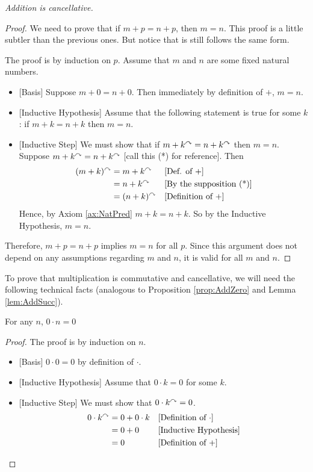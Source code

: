 \begin{prop}
  \emph{Addition is cancellative.}

\begin{proof}
  We need to prove that if $m + p= n+p$, then $m=n$.  This proof is a little subtler than the previous ones. But notice that is
  still follows the same form.
  
  The proof is by induction on $p$. Assume that $m$ and $n$ are some fixed natural numbers.
  \begin{itemize}
  \item{}[Basis] Suppose $m+0 = n+ 0$. Then immediately by definition
    of $+$, $m=n$.
  \item{}[Inductive Hypothesis] Assume that the following statement is true for some $k$: if $m + k = n + k$ then $m=n$.
  \item{}[Inductive Step] We must show that 
    if $m+k^\curvearrowright = n+k^\curvearrowright$ then $m=n$. Suppose $m+k^\curvearrowright = n + k^\curvearrowright$ [call this (*) for reference]. Then
    \begin{align*}
      (m+k)^\curvearrowright & = m + k^\curvearrowright &&\text{[Def. of $+$]}\\
      & = n + k^\curvearrowright &&\text{[By the supposition (*)]}\\
      & = (n+k)^\curvearrowright &&\text{[Definition of $+$]}
    \end{align*}
    Hence, by Axiom \ref{ax:NatPred} $m+k=n+k$. So by the Inductive Hypothesis, $m=n$.
  \end{itemize}
  Therefore, $m + p = n + p$ implies $m = n$ for all $p$. Since this argument does not
depend on any assumptions regarding $m$ and $n$, it is valid for all $m$ and $n$.
\end{proof}
\end{prop}
\ipadbreak

To prove that multiplication is commutative and cancellative, we will
need the following technical facts (analogous to Proposition
\ref{prop:AddZero} and Lemma \ref{lem:AddSucc}).

\begin{lem}\label{lem:MultZero}
  For any $n$, $0\cdot n = 0$

  \begin{proof}
    The proof is by induction on $n$.
    \begin{itemize}
    \item{}[Basis] $0\cdot 0 = 0$ by definition of $\cdot$.
    \item{}[Inductive Hypothesis] Assume that $0\cdot k = 0$ for some
      $k$.
    \item{}[Inductive Step] We must show that $0\cdot k^\curvearrowright = 0$.
      \begin{align*}
        0\cdot k^\curvearrowright &= 0 + 0\cdot k &&\text{[Definition of $\cdot$]}\\
        &= 0 + 0 &&\text{[Inductive Hypothesis]}\\
        &= 0&&\text{[Definition of $+$]}
      \end{align*}
    \end{itemize}
  \end{proof}
\end{lem}

